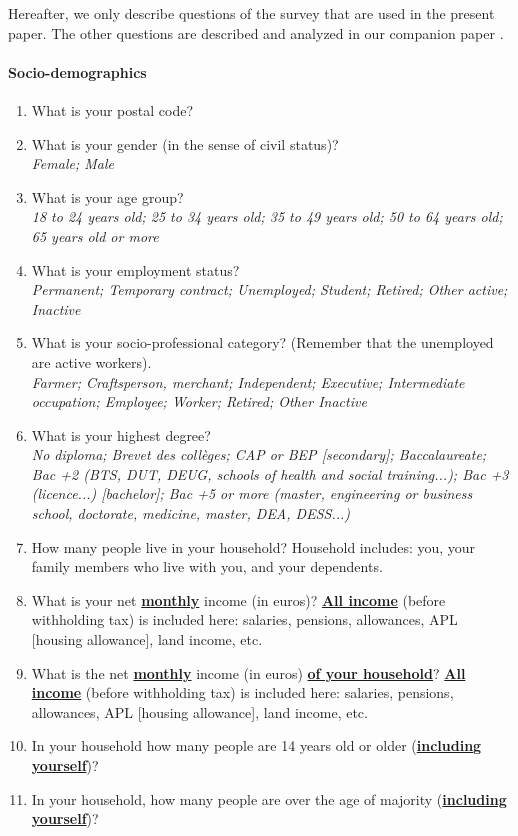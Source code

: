 \documentclass[english,5p,authoryear]{elsarticle}
\begin{document}
\begin{appendices}
Hereafter, we only describe questions of the survey that are used
in the present paper. The other questions are described and analyzed
in our companion paper \citep{douenne_can_2019}.

\paragraph{Socio-demographics}
\begin{enumerate}[resume,leftmargin=*]
\item What is your postal code? 
\item What is your gender (in the sense of civil status)? \emph{}\\
\emph{Female; Male }
\item What is your age group? \emph{}\\
\emph{18 to 24 years old; 25 to 34 years old; 35 to 49 years old;
50 to 64 years old; 65 years old or more} 
\item What is your employment status? \emph{}\\
\emph{Permanent; Temporary contract; Unemployed; Student; Retired;
Other active; Inactive}
\item What is your socio-professional category? (Remember that the unemployed
are active workers). \emph{}\\
\emph{Farmer; Craftsperson, merchant; Independent; Executive; Intermediate
occupation; Employee; Worker; Retired; Other Inactive} 
\item What is your highest degree? \emph{}\\
\emph{No diploma; Brevet des collèges; CAP or BEP {[}secondary{]};
Baccalaureate; Bac +2 (BTS, DUT, DEUG, schools of health and social
training...); Bac +3 (licence...) {[}bachelor{]}; Bac +5 or more (master,
engineering or business school, doctorate, medicine, master, DEA,
DESS...)}
\item How many people live in your household? Household includes: you, your
family members who live with you, and your dependents. 
\item What is your net \textbf{\uline{monthly}} income (in euros)? \textbf{\uline{All
income}} (before withholding tax) is included here: salaries, pensions,
allowances, APL {[}housing allowance{]}, land income, etc. 
\item What is the net \textbf{\uline{monthly}} income (in euros) \textbf{\uline{of
your household}}? \textbf{\uline{All income}} (before withholding
tax) is included here: salaries, pensions, allowances, APL {[}housing
allowance{]}, land income, etc. 
\item In your household how many people are 14 years old or older (\textbf{\uline{including
yourself}})? 
\item In your household, how many people are over the age of majority (\textbf{\uline{including
yourself}})? 
\end{enumerate}


\end{appendices}
\end{document}
